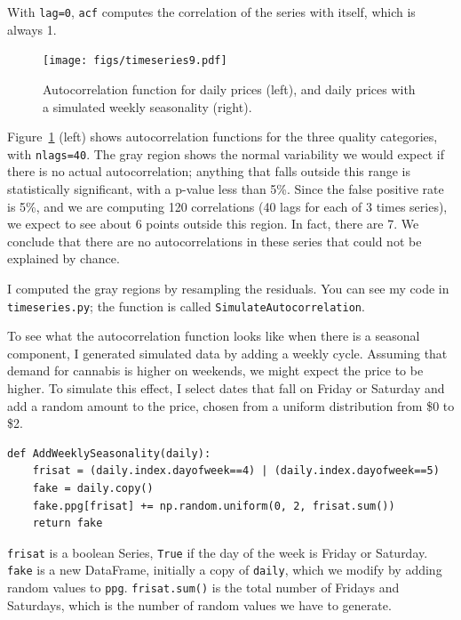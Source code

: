 \documentclass[12pt]{book}
\theoremstyle{exercise}
\begin{document}
With {\tt lag=0}, {\tt acf} computes the correlation of the series
with itself, which is always 1.%

\begin{figure}
\centerline{\texttt{[image: figs/timeseries9.pdf]}}
\caption{Autocorrelation function for daily prices (left), and
daily prices with a simulated weekly seasonality (right).}%
\label{timeseries9}
\end{figure}

Figure~\ref{timeseries9} (left) shows autocorrelation functions for
the three quality categories, with {\tt nlags=40}.  The gray region
shows the normal variability we would expect if there is no actual
autocorrelation; anything that falls outside this range is
statistically significant, with a p-value less than 5\%.  Since
the false positive rate is 5\%, and
we are computing 120 correlations (40 lags for each of 3 times series),
we expect to see about 6 points outside this region.  In fact, there
are 7.  We conclude that there are no autocorrelations
in these series that could not be explained by chance.%
%
%
%

I computed the gray regions by resampling the residuals.  You
can see my code in {\tt timeseries.py}; the function is called
{\tt SimulateAutocorrelation}.%

To see what the autocorrelation function looks like when there is a
seasonal component, I generated simulated data by adding a weekly
cycle.  Assuming that demand for cannabis is higher on weekends, we
might expect the price to be higher.  To simulate this effect, I
select dates that fall on Friday or Saturday and add a random amount
to the price, chosen from a uniform distribution from \$0 to \$2.%
%
%

\begin{verbatim}
def AddWeeklySeasonality(daily):
    frisat = (daily.index.dayofweek==4) | (daily.index.dayofweek==5)
    fake = daily.copy()
    fake.ppg[frisat] += np.random.uniform(0, 2, frisat.sum())
    return fake
\end{verbatim}

{\tt frisat} is a boolean Series, {\tt True} if the day of the
week is Friday or Saturday.  {\tt fake} is a new DataFrame, initially
a copy of {\tt daily}, which we modify by adding random values
to {\tt ppg}.  {\tt frisat.sum()} is the total number of Fridays
and Saturdays, which is the number of random values we have to
generate.%
%
%
\end{document}
